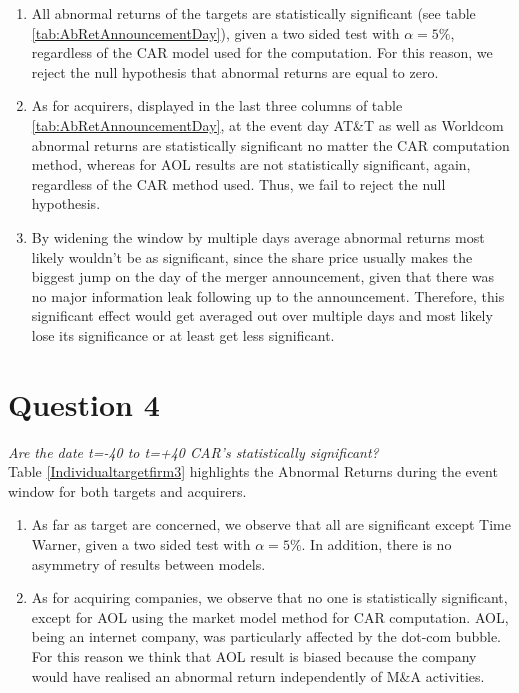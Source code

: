 \documentclass[11pt,a4paper,openany,oneside]{article}%
\begin{document}
\begin{enumerate}[label=\alph*),leftmargin=*]
    \item All abnormal returns of the targets are statistically significant (see table \ref{tab:AbRetAnnouncementDay}), given a two sided test with $\alpha=5\%$, regardless of the CAR model used for the computation. For this reason, we reject the null hypothesis that abnormal returns are equal to zero.
    \item As for acquirers, displayed in the last three columns of table \ref{tab:AbRetAnnouncementDay}, at the event day AT\&T as well as Worldcom abnormal returns are statistically significant no matter the CAR computation method, whereas for AOL results are not statistically significant, again, regardless of the CAR method used. Thus, we fail to reject the null hypothesis.
    \item By widening the window by multiple days average abnormal returns most likely wouldn’t be as significant, since the share price usually makes the biggest jump on the day of the merger announcement, given that there was no major information leak following up to the announcement. Therefore, this significant effect would get averaged out over multiple days and most likely lose its significance or at least get less significant.
\end{enumerate}

\section{Question 4}
\textit{Are the date t=-40 to t=+40 CAR’s statistically significant?}\\
Table \ref{Individualtargetfirm3} highlights the Abnormal Returns during the event window for both targets and acquirers.
\begin{enumerate}[label=\alph*),leftmargin=*]
    \item As far as target are concerned, we observe that all are significant except Time Warner, given a two sided test with $\alpha=5\%$. In addition, there is no asymmetry of results between models.
    \item As for acquiring companies, we observe that no one is statistically significant, except for AOL using the market model method for CAR computation. AOL, being an internet company, was particularly affected by the dot-com bubble. For this reason we think that AOL result is biased because the company would have realised an abnormal return independently of M\&A activities.
\end{enumerate}
\end{document}
